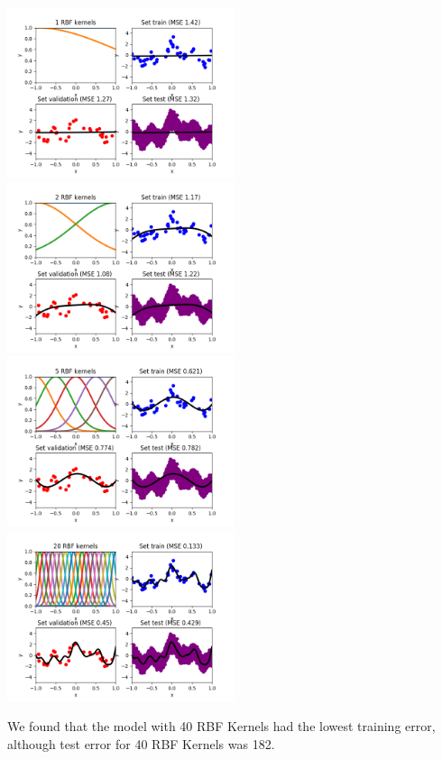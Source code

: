 \documentclass[a4paper]{article}
\begin{document}
\noindent
\includegraphics[width=0.5\textwidth]{linreg_c1.png}%
\includegraphics[width=0.5\textwidth]{linreg_c2.png}\\[2em]
\includegraphics[width=0.5\textwidth]{linreg_c5.png}%
\includegraphics[width=0.5\textwidth]{linreg_c20.png}\par

We found that the model with 40 RBF Kernels had the lowest training error, although test error for 40 RBF Kernels was 182.
\end{document}
